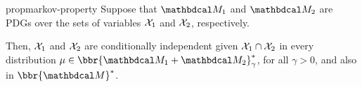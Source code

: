 \documentclass{article}
\newcommand\discard[1]{}
\begin{document}
\begin{linked}{prop}{markov-property}
    Suppose that $\dg M_1$ and $\dg M_2$ are PDGs
    over the sets of variables $\mathcal X_1$ and $\mathcal X_2$, respectively.
%
\discard{
    Then for all $\gamma > 0$, we have that
    \[  \bbr{\dg M_1 \bundle \dg M_2}^*_\gamma
			~\models~
		\X_1 \mathbin{\bot\!\!\!\bot} \X_2 \mid \X_1 \cap \X_2. \] 
    That is: for every distribution $\mu \in \bbr{\dg M_1 \bundle \dg M_2}^*_\gamma$,
    the variables of $\dg M_1$ and of $\dg M_2$ are conditionally independent given the variables they have in common.
}
Then,
$\mathcal X_1$
and $\mathcal X_2$
are conditionally independent given $\mathcal X_1 \cap \mathcal X_2$
in every distribution $\mu \in \bbr{\dg M_1 \bundle \dg M_2}^*_\gamma$,
for all $\gamma > 0$,
and also in $\bbr{\dg M}^*$. 
\end{linked}
\end{document}
